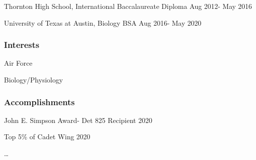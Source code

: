 \documentclass[]{article}
\begin{document}
Thornton High School, International Baccalaureate Diploma Aug 2012- May
2016

University of Texas at Austin, Biology BSA Aug 2016- May 2020

\hypertarget{interests}{%
\subsubsection{Interests}\label{interests}}

Air Force

Biology/Physiology

\hypertarget{accomplishments}{%
\subsubsection{Accomplishments}\label{accomplishments}}

John E. Simpson Award- Det 825 Recipient 2020

Top 5\% of Cadet Wing 2020

\ldots{}
\end{document}
